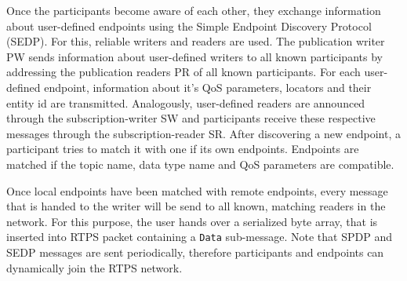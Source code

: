Once the participants become aware of each other, they exchange information about user-defined endpoints using the Simple Endpoint Discovery Protocol (SEDP). For this, reliable writers and readers are used. The publication writer PW sends information about user-defined writers to all known participants by addressing the publication readers PR of all known participants. For each user-defined endpoint, information about it’s QoS parameters, locators and their entity id are transmitted. Analogously, user-defined readers are announced through the subscription-writer SW and participants receive these respective messages through the subscription-reader SR. After discovering a new endpoint, a participant tries to match it with one if its own endpoints. Endpoints are matched if the topic name, data type name and QoS parameters are compatible.

Once local endpoints have been matched with remote endpoints, every message that is handed to the writer will be send to all known, matching readers in the network. For this purpose, the user hands over a serialized byte array, that is inserted into RTPS packet containing a \texttt{Data} sub-message. Note that SPDP and SEDP messages are sent periodically, therefore participants and endpoints can dynamically join the RTPS network.